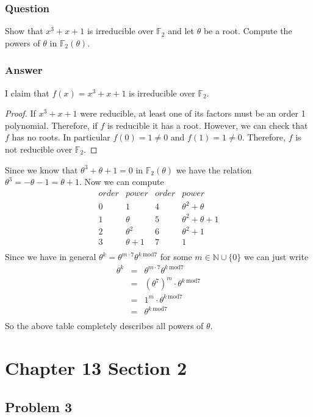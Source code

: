 \documentclass[10pt]{article}
\begin{document}
\subsubsection{Question}
Show that $x^3+x+1$ is irreducible over $\mathbb{F}_2$ and let $\theta$ be a root. Compute the powers of $\theta$ in $\mathbb{F}_2(\theta)$.
\subsubsection{Answer}
I claim that $f(x)=x^3+x+1$ is irreducible over $\mathbb{F}_2$.
\begin{proof}
If $x^3+x+1$ were reducible, at least one of its factors must be an order 1 polynomial. Therefore, if $f$ is reducible it has a root. However, we can check that $f$ has no roots. In particular $f(0)=1\neq0$ and $f(1)=1\neq0$. Therefore, $f$ is not reducible over $\mathbb{F}_2$.
\end{proof}

Since we know that $\theta^3+\theta+1=0$ in $\mathbb{F}_2(\theta)$ we have the relation $\theta^3=-\theta-1=\theta+1$. Now we can compute
\[\begin{array}{ll|ll}
order &power&order&power\\
\hline
0&1&4&\theta^2+\theta\\
1&\theta&5&\theta^2+\theta+1\\
2&\theta^2&6&\theta^2+1\\
3&\theta+1&7&1\\
\end{array}
\]
Since we have in general $\theta^k=\theta^{m\cdot 7}\theta^{k \mathrm{\ mod} 7}$ for some $m \in\mathbb{N}\cup\{0\}$ we can just write
\begin{eqnarray*}
\theta^k&=&\theta^{m\cdot 7}\theta^{k \mathrm{\ mod} 7}\\
&=&\left(\theta^7\right)^m \cdot \theta^{k \mathrm{\ mod} 7}\\
&=&1^m\cdot \theta^{k \mathrm{\ mod} 7}\\
&=&\theta^{k \mathrm{\ mod} 7}\\
\end{eqnarray*}
So the above table completely describes all powers of $\theta$.
\section{Chapter 13 Section 2}
\subsection{Problem 3}
\end{document}
